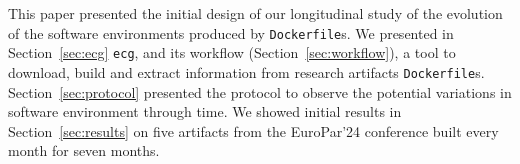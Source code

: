 \documentclass[sigconf,natbib=false]{acmart}
\newcommand{\ie}{\emph{i.e.,}}
\newcommand{\df}{\texttt{Dockerfile}}
\newcommand{\ecg}{\texttt{ecg}}
\begin{document}
% 
% 
% 
% 
% 
% 


This paper presented the initial design of our longitudinal study of the evolution of the software environments produced by \df s.
We presented in Section~\ref{sec:ecg} \ecg, and its workflow (Section~\ref{sec:workflow}), a tool to download, build and extract information from research artifacts \df s.
Section~\ref{sec:protocol} presented the protocol to observe the potential variations in software environment through time.
We showed initial results in Section~\ref{sec:results} on five artifacts from the EuroPar'24 conference built every month for seven months.
\end{document}

